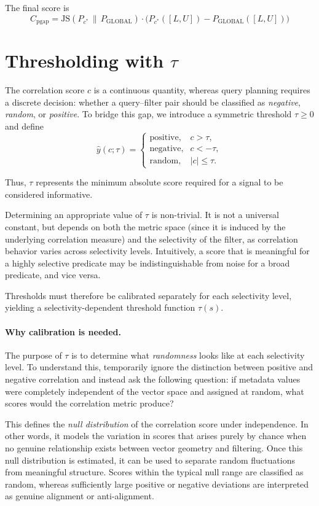 The final score is
\[
C_{\mathrm{pgap}}
=
\mathrm{JS}(P_{c^*} \,\|\, P_{\mathrm{GLOBAL}})
\cdot
\big(
P_{c^*}([L,U]) - P_{\mathrm{GLOBAL}}([L,U])
\big)
\]

\section{Thresholding with \texorpdfstring{$\tau$}{tau}}\label{sec:tau}

The correlation score \(c\) is a continuous quantity, whereas query planning requires a discrete decision: whether a query--filter pair should be classified as \emph{negative}, \emph{random}, or \emph{positive}. To bridge this gap, we introduce a symmetric threshold \(\tau \geq 0\) and define
\[
\hat{y}(c;\tau)=
\begin{cases}
\text{positive}, & c>\tau,\\[4pt]
\text{negative}, & c<-\tau,\\[4pt]
\text{random}, & |c|\leq \tau.
\end{cases}
\]

Thus, \(\tau\) represents the minimum absolute score required for a signal to be considered informative.

Determining an appropriate value of \(\tau\) is non-trivial. It is not a universal constant, but depends on both the metric space (since it is induced by the underlying correlation measure) and the selectivity of the filter, as correlation behavior varies across selectivity levels. Intuitively, a score that is meaningful for a highly selective predicate may be indistinguishable from noise for a broad predicate, and vice versa.

Thresholds must therefore be calibrated separately for each selectivity level, yielding a selectivity-dependent threshold function \(\tau(s)\).

\paragraph{Why calibration is needed.}
The purpose of \(\tau\) is to determine what \emph{randomness} looks like at each selectivity level. 
To understand this, temporarily ignore the distinction between positive and negative correlation and instead ask the following question: if metadata values were completely independent of the vector space and assigned at random, what scores would the correlation metric produce?

This defines the \emph{null distribution} of the correlation score under independence. 
In other words, it models the variation in scores that arises purely by chance when no genuine relationship exists between vector geometry and filtering. 
Once this null distribution is estimated, it can be used to separate random fluctuations from meaningful structure. 
Scores within the typical null range are classified as random, whereas sufficiently large positive or negative deviations are interpreted as genuine alignment or anti-alignment.

